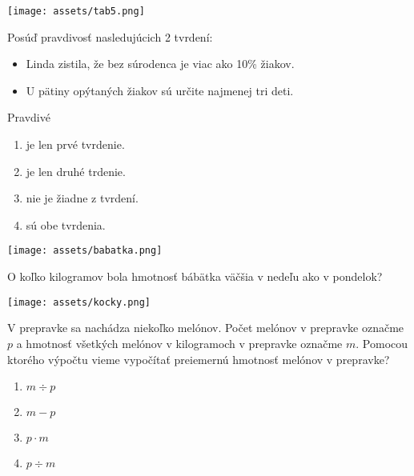 \begin{center}
	\texttt{[image: assets/tab5.png]}
\end{center}

\begin{example}
	Posúď pravdivosť nasledujúcich 2 tvrdení:
	
	\begin{itemize}
		\item Linda zistila, že bez súrodenca je viac ako 10\% žiakov.
		\item U pätiny opýtaných žiakov sú určite najmenej tri deti.
	\end{itemize}
	
	Pravdivé
	\begin{enumerate}
		\item je len prvé tvrdenie.
		\item je len druhé trdenie.
		\item nie je žiadne z tvrdení.
		\item sú obe tvrdenia.
	\end{enumerate}
\end{example}

\begin{center}
	\texttt{[image: assets/babatka.png]}
\end{center}

\begin{example}
	O koľko kilogramov bola hmotnosť bábätka väčšia v nedeľu ako v pondelok?
\end{example}

\begin{example}
	
	\begin{center}
		\texttt{[image: assets/kocky.png]}
	\end{center}
	
\end{example}

\begin{example}
	V prepravke sa nachádza niekoľko melónov. Počet melónov v prepravke označme $p$ a hmotnosť všetkých melónov v kilogramoch v prepravke označme $m$. Pomocou ktorého výpočtu vieme vypočítať preiemernú hmotnosť melónov v prepravke?
	
	\begin{enumerate}
		\item $m \div p$
		\item $m - p$
		\item $p \cdot m$
		\item $p \div m$
	\end{enumerate}
\end{example}

